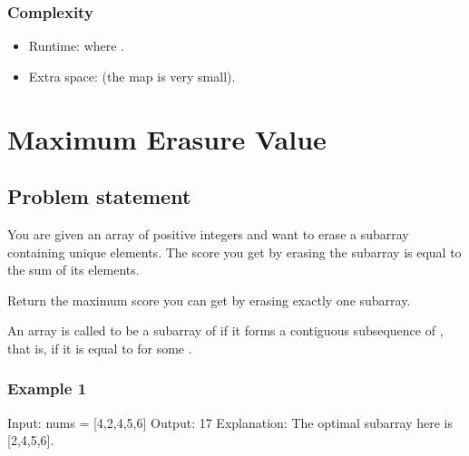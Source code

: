 \documentclass[letterpaper,12pt,english]{book}
\begin{document}
\subsubsection{Complexity}
\label{\detokenize{Hash_Table/03_H_13_Roman_to_Integer:complexity}}\begin{itemize}
\item {} 
\sphinxAtStartPar
Runtime:  where .

\item {} 
\sphinxAtStartPar
Extra space:  (the map  is very small).

\end{itemize}

\sphinxstepscope


\section{Maximum Erasure Value}
\label{\detokenize{Hash_Table/03_H_1695_Maximum_Erasure_Value:maximum-erasure-value}}\label{\detokenize{Hash_Table/03_H_1695_Maximum_Erasure_Value::doc}}

\subsection{Problem statement\sphinxfootnotemark[24]}
\label{\detokenize{Hash_Table/03_H_1695_Maximum_Erasure_Value:problem-statement}}%
\begin{footnotetext}[24]\sphinxAtStartFootnote
{}
%
\end{footnotetext}\ignorespaces 
\sphinxAtStartPar
You are given an array of positive integers  and want to erase a subarray containing unique elements. The score you get by erasing the subarray is equal to the sum of its elements.

\sphinxAtStartPar
Return the maximum score you can get by erasing exactly one subarray.

\sphinxAtStartPar
An array  is called to be a subarray of  if it forms a contiguous subsequence of , that is, if it is equal to  for some .


\subsubsection{Example 1}
\label{\detokenize{Hash_Table/03_H_1695_Maximum_Erasure_Value:example-1}}
\begin{sphinxVerbatim}[commandchars=\\\{\}]
Input: nums = [4,2,4,5,6]
Output: 17
Explanation: The optimal subarray here is [2,4,5,6].
\end{sphinxVerbatim}
\end{document}
